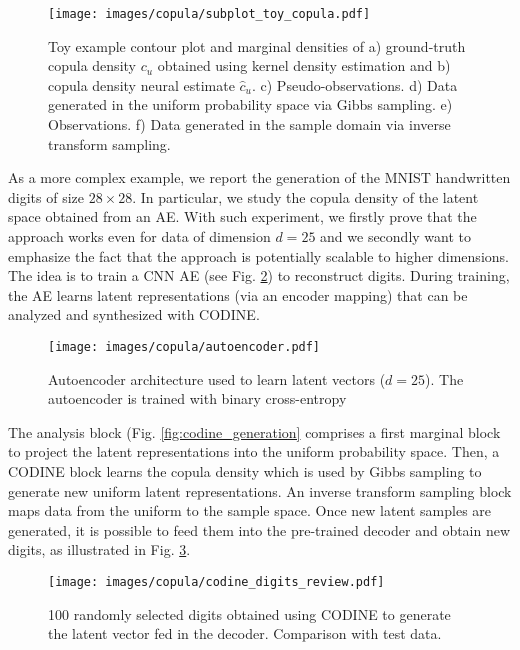 \begin{figure}[t]
	\centering
	\texttt{[image: images/copula/subplot\_toy\_copula.pdf]}
	\caption{Toy example contour plot and marginal densities of a) ground-truth copula density $c_u$ obtained using kernel density estimation and b) copula density neural estimate $\hat{c}_u$. c) Pseudo-observations. d) Data generated in the uniform probability space via Gibbs sampling. e) Observations. f) Data generated in the sample domain via inverse transform sampling.}
	\label{fig:codine_toy}
\end{figure}

As a more complex example, we report the generation of the MNIST handwritten digits of size $28 \times 28$. In particular, we study the copula density of the latent space obtained from an AE. 
With such experiment, we firstly prove that the approach works even for data of dimension $d = 25$ and we secondly want to emphasize the fact that the approach is potentially scalable to higher dimensions. 
The idea is to train a CNN AE (see Fig. \ref{fig:codine_architecture}) to reconstruct digits. During training, the AE learns latent representations (via an encoder mapping) that can be analyzed and synthesized with CODINE. 

\begin{figure}[t]
	\centering
	\texttt{[image: images/copula/autoencoder.pdf]}
	\caption{Autoencoder architecture used to learn latent vectors ($d=25$). The autoencoder is trained with binary cross-entropy}
	\label{fig:codine_architecture}
\end{figure}

The analysis block (Fig. \ref{fig:codine_generation} comprises a first marginal block to project the latent representations into the uniform probability space. Then, a CODINE block learns the copula density which is used by Gibbs sampling to generate new uniform latent representations. An inverse transform sampling block maps data from the uniform to the sample space.
Once new latent samples are generated, it is possible to feed them into the pre-trained decoder and obtain new digits, as illustrated in Fig. \ref{fig:codine_digits}.

\begin{figure}[b]
	\centering
	\texttt{[image: images/copula/codine\_digits\_review.pdf]}
	\caption{100 randomly selected digits obtained using CODINE to generate the latent vector fed in the decoder. Comparison with test data.}
	\label{fig:codine_digits}
\end{figure}

